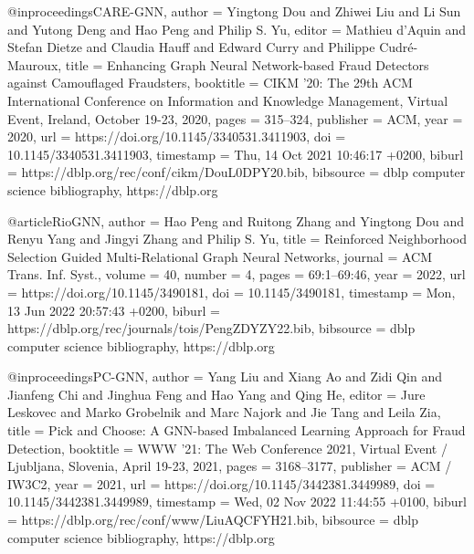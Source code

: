 @inproceedings{CARE-GNN,
  author    = {Yingtong Dou and
               Zhiwei Liu and
               Li Sun and
               Yutong Deng and
               Hao Peng and
               Philip S. Yu},
  editor    = {Mathieu d'Aquin and
               Stefan Dietze and
               Claudia Hauff and
               Edward Curry and
               Philippe Cudr{\'{e}}{-}Mauroux},
  title     = {Enhancing Graph Neural Network-based Fraud Detectors against Camouflaged
               Fraudsters},
  booktitle = {{CIKM} '20: The 29th {ACM} International Conference on Information
               and Knowledge Management, Virtual Event, Ireland, October 19-23, 2020},
  pages     = {315--324},
  publisher = {{ACM}},
  year      = {2020},
  url       = {https://doi.org/10.1145/3340531.3411903},
  doi       = {10.1145/3340531.3411903},
  timestamp = {Thu, 14 Oct 2021 10:46:17 +0200},
  biburl    = {https://dblp.org/rec/conf/cikm/DouL0DPY20.bib},
  bibsource = {dblp computer science bibliography, https://dblp.org}
}

@article{RioGNN,
  author    = {Hao Peng and
               Ruitong Zhang and
               Yingtong Dou and
               Renyu Yang and
               Jingyi Zhang and
               Philip S. Yu},
  title     = {Reinforced Neighborhood Selection Guided Multi-Relational Graph Neural
               Networks},
  journal   = {{ACM} Trans. Inf. Syst.},
  volume    = {40},
  number    = {4},
  pages     = {69:1--69:46},
  year      = {2022},
  url       = {https://doi.org/10.1145/3490181},
  doi       = {10.1145/3490181},
  timestamp = {Mon, 13 Jun 2022 20:57:43 +0200},
  biburl    = {https://dblp.org/rec/journals/tois/PengZDYZY22.bib},
  bibsource = {dblp computer science bibliography, https://dblp.org}
}

@inproceedings{PC-GNN,
  author    = {Yang Liu and
               Xiang Ao and
               Zidi Qin and
               Jianfeng Chi and
               Jinghua Feng and
               Hao Yang and
               Qing He},
  editor    = {Jure Leskovec and
               Marko Grobelnik and
               Marc Najork and
               Jie Tang and
               Leila Zia},
  title     = {Pick and Choose: {A} GNN-based Imbalanced Learning Approach for Fraud
               Detection},
  booktitle = {{WWW} '21: The Web Conference 2021, Virtual Event / Ljubljana, Slovenia,
               April 19-23, 2021},
  pages     = {3168--3177},
  publisher = {{ACM} / {IW3C2}},
  year      = {2021},
  url       = {https://doi.org/10.1145/3442381.3449989},
  doi       = {10.1145/3442381.3449989},
  timestamp = {Wed, 02 Nov 2022 11:44:55 +0100},
  biburl    = {https://dblp.org/rec/conf/www/LiuAQCFYH21.bib},
  bibsource = {dblp computer science bibliography, https://dblp.org}
}

